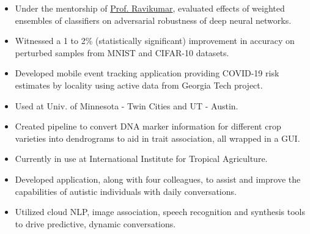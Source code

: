 \documentclass[10pt,a4paper,ragged2e,withhyper]{altacv}
\begin{document}
\begin{paracol}{2}
\begin{itemize}
    \item Under the mentorship of \href{http://www.cs.cmu.edu/~pradeepr/}{\textcolor{Mahogany}{Prof. Ravikumar}}, evaluated effects of weighted ensembles of classifiers on adversarial robustness of deep neural networks.
    \item Witnessed a 1 to 2\% (statistically significant) improvement in accuracy on perturbed samples from MNIST and CIFAR-10 datasets.
\end{itemize}


\begin{itemize}
\item Developed mobile event tracking application providing COVID-19 risk estimates by locality using active data from Georgia Tech project.
\item Used at Univ. of Minnesota - Twin Cities and UT - Austin.
\end{itemize}

\vspace{-5pt}
\divider
\vspace{-5pt}

\begin{itemize}
\item Created pipeline to convert DNA marker information for different crop varieties into dendrograms to aid in trait association, all wrapped in a GUI.
\item Currently in use at International Institute for Tropical Agriculture.
\end{itemize}

\vspace{-5pt}
\divider
\vspace{-5pt}

\begin{itemize}
\item Developed application, along with four colleagues, to assist and improve the capabilities of autistic individuals with daily conversations.
\item Utilized cloud NLP, image association, speech recognition and synthesis tools to drive predictive, dynamic conversations.
\end{itemize}


\end{paracol}
\end{document}
